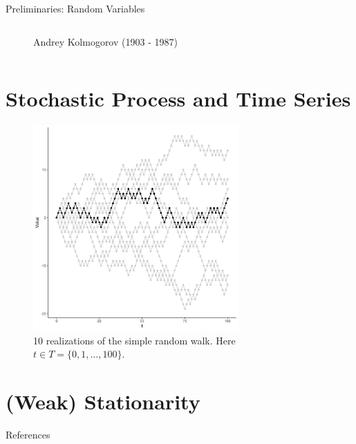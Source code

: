 \documentclass{beamer}
\begin{document}
\begin{frame}{Preliminaries: Random Variables}
\begin{columns}
\begin{column}{0.5\textwidth}
\begin{figure}
          \caption{Andrey Kolmogorov (1903 - 1987)}
        \end{figure}
    \end{column}
\end{columns}
\end{frame}


\section{Stochastic Process and Time Series \parencite{brockwell2009}}


\begin{frame}
  \begin{figure}
    \centering
    \includegraphics[width=0.7\textwidth, height=0.7\textwidth]{random_walk.jpg}
    \caption{10 realizations of the simple random walk. Here $t \in T = \{0, 1,
    \ldots, 100\}$.}
  \end{figure}
\end{frame}


\section{(Weak) Stationarity}


\begin{frame}[allowframebreaks]{References}
  \printbibliography
\end{frame}
\end{document}
